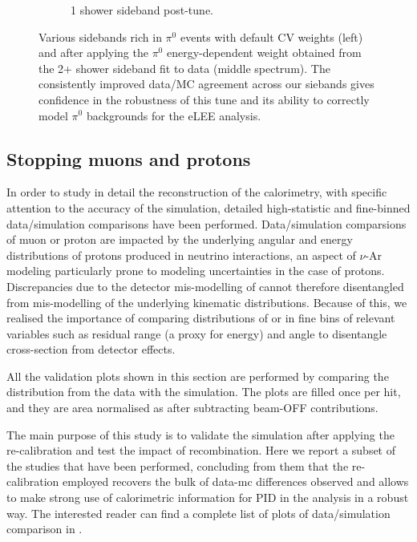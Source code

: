 \begin{figure}[H]
\begin{center}
\begin{subfigure}[b]{0.45\textwidth}
    \caption{\label{fig:pi0tune05} 1 shower sideband post-tune.}
    \end{subfigure}
\caption{\label{fig:pi0norm}Various sidebands rich in $\pi^0$ events with default CV weights (left) and after applying the $\pi^0$ energy-dependent weight obtained from the 2+ shower sideband fit to data (middle spectrum). The consistently improved data/MC agreement across our siebands gives confidence in the robustness of this tune and its ability to correctly model $\pi^0$ backgrounds for the eLEE analysis.}
\end{center}
\end{figure}

\subsection{Stopping muons and protons}
\label{sec:sideband:stopping_muons_protons}

In order to study in detail the reconstruction of the calorimetry, with specific attention to the accuracy of the simulation, detailed high-statistic and fine-binned data/simulation comparisons have been performed.
Data/simulation comparsions of muon or proton \dedx are impacted by the underlying angular and energy distributions of protons produced in neutrino interactions, an aspect of $\nu$-Ar modeling particularly prone to modeling uncertainties in the case of protons. Discrepancies due to the detector mis-modelling of \dedx cannot therefore disentangled from mis-modelling of the underlying kinematic distributions.
Because of this, we realised the importance of comparing distributions of \dqdx or \dedx in fine bins of relevant variables such as residual range (a proxy for energy) and angle to disentangle cross-section from detector effects.

All the validation plots shown in this section are performed by comparing the \dqdx distribution from the data with the simulation.
The plots are filled once per hit, and they are area normalised as after subtracting beam-OFF contributions.%

The main purpose of this study is to validate the simulation after applying the re-calibration and test the impact of recombination.
Here we report a subset of the studies that have been performed, concluding from them that the re-calibration employed recovers the bulk of data-mc differences observed and allows to make strong use of calorimetric information for PID in the analysis in a robust way.
The interested reader can find a complete list of plots of data/simulation comparison in \cite{bib:pid_internal_note}.

